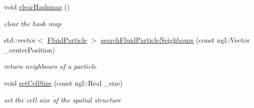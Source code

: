 \begin{DoxyCompactItemize}
void \hyperlink{class_spatial_hashing_a58638653aed1d4d304c6e2aa839ba9ba}{clearHashmap} ()
\begin{DoxyCompactList}\small\item\em clear the hash map \item\end{DoxyCompactList}\item 
std::vector$<$ \hyperlink{class_fluid_particle}{FluidParticle} $>$ \hyperlink{class_spatial_hashing_af5c8f67520bfd03e32800e87af56ffba}{searchFluidParticleNeighbours} (const ngl::Vector \_\-centerPosition)
\begin{DoxyCompactList}\small\item\em return neighbours of a particle \item\end{DoxyCompactList}\item 
void \hyperlink{class_spatial_hashing_a430ce0c699a8ef34a5f8f152d59f06a8}{setCellSize} (const ngl::Real \_\-size)
\begin{DoxyCompactList}\small\item\em set the cell size of the spatial structure \item\end{DoxyCompactList}\end{DoxyCompactItemize}
